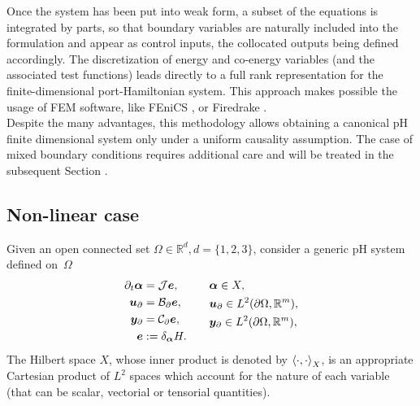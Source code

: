 Once the system has been put into weak form, a subset of the equations is integrated by parts, so that boundary variables are naturally included into the formulation and appear as control inputs, the collocated outputs being defined accordingly. The discretization of energy and co-energy variables (and the associated test functions) leads directly to a full rank representation for the finite-dimensional port-Hamiltonian system.  This approach makes possible the usage of FEM software, like FEniCS \cite{logg2012}, or Firedrake \cite{rathgeber2017firedrake}. \\

Despite the many advantages, this methodology allows obtaining a canonical pH finite dimensional system only under a uniform causality assumption. The case of mixed boundary conditions requires additional care and will be treated in the subsequent Section .

\subsection{Non-linear case}
Given an open connected set $\Omega \in \mathbb{R}^d, d= \{1,2,3\}$, consider a generic pH system defined on~$\Omega$
\begin{equation}\label{eq:phsys2}
\begin{aligned}[t]
\partial_t {\bm{\alpha}} &= \mathcal{J}\displaystyle \bm{e}, \vspace{3pt}\\
\bm{u}_\partial &= \mathcal{B}_\partial  \displaystyle \bm{e}, \vspace{3pt}\\
\bm{y}_\partial &= \mathcal{C}_\partial \displaystyle \bm{e}, \vspace{3pt}\\
\bm{e} &:= \displaystyle \delta_{\bm{\alpha}}H.
\end{aligned} \qquad
\begin{aligned}[t]
&\bm{\alpha} \in X, \\
&\bm{u}_\partial \in L^2(\partial \Omega, \mathbb{R}^m), \\
&\bm{y}_\partial \in L^2(\partial \Omega, \mathbb{R}^m),
\end{aligned}
\end{equation}
The Hilbert space $X$, whose inner product is denoted by $\inner[X]{\cdot}{\cdot}$, is an appropriate Cartesian product of $L^2$ spaces which account for the nature of each variable (that can be scalar, vectorial or tensorial quantities). \\

